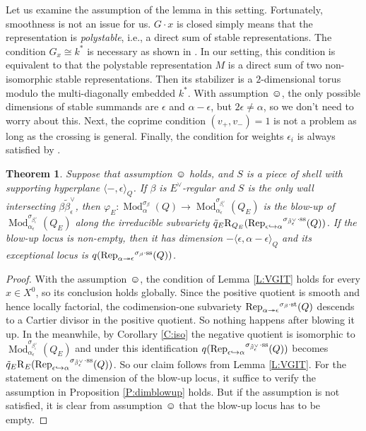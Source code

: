 \documentclass{amsart}
\newtheorem{theorem}{Theorem}[section]
\theoremstyle{definition}
\theoremstyle{remark}
\numberwithin{equation}{section}
\begin{document}
Let us examine the assumption of the lemma in this setting.
Fortunately, smoothness is not an issue for us. $G\cdot x$ is closed simply means that the representation is {\em polystable}, i.e., a direct sum of stable representations. The condition $G_x\cong k^*$ is necessary as shown in \cite[Counterexample 5.8]{T}. In our setting, this condition is equivalent to that the polystable representation $M$ is a direct sum of two non-isomorphic stable representations. Then its stabilizer is a $2$-dimensional torus modulo the multi-diagonally embedded $k^*$. With assumption $\smiley$, the only possible dimensions of stable summands are $\epsilon$ and $\alpha-\epsilon$, but $2\epsilon\neq\alpha$, so we don't need to worry about this. Next, the coprime condition $(v_+,v_-)=1$ is not a problem as long as the crossing is general. Finally, the condition for weights $\epsilon_i$ is always satisfied by \cite[Proposition 4.9]{T}.

\begin{theorem} \label{T:blow-up} Suppose that assumption $\smiley$ holds, and $S$ is a piece of shell with supporting hyperplane ${\langle{-,\epsilon}\rangle}_Q$. If $\beta$ is $E^\vee$-regular and $S$ is the only wall intersecting $\beta\tilde{\beta}_\epsilon^\vee$, then
$\varphi_E:{\operatorname{Mod}}_\alpha^{\sigma_\beta}(Q)\to{\operatorname{Mod}}_{\alpha_\epsilon}^{\sigma_{\beta_\epsilon^\vee}}(Q_E)$
is the blow-up of ${\operatorname{Mod}}_{\alpha_\epsilon}^{\sigma_{\beta_\epsilon^\vee}}(Q_E)$ along the irreducible subvariety $\tilde{q}_E{\operatorname{R}}_{Q_E}({\operatorname{Rep}}_{\epsilon\hookrightarrow\alpha}{^{\sigma_{{\tilde{\beta}_\epsilon^\vee}}\cdot{\rm {ss}}}}(Q))$. If the blow-up locus is non-empty, then it has dimension $-{\langle{\epsilon,\alpha-\epsilon}\rangle}_Q$ and its exceptional locus is $q({\operatorname{Rep}}_{\alpha\twoheadrightarrow\epsilon}{^{\sigma_{{\beta}}\cdot{\rm {ss}}}}(Q))$.
\end{theorem}

\begin{proof} With the assumption $\smiley$, the condition of Lemma \ref{L:VGIT} holds for every $x\in X^0$, so its conclusion holds globally. Since the positive quotient is smooth and hence locally factorial, the codimension-one subvariety ${\operatorname{Rep}}_{\alpha\twoheadrightarrow\epsilon}{^{\sigma_{{\beta}}\cdot{\rm {st}}}}(Q)$ descends to a Cartier divisor in the positive quotient. So nothing happens after blowing it up. In the meanwhile, by Corollary \ref{C:iso} the negative quotient is isomorphic to ${\operatorname{Mod}}_{\alpha_\epsilon}^{\sigma_{\beta_\epsilon^\vee}}(Q_E)$ and under this identification $q({\operatorname{Rep}}_{\epsilon\hookrightarrow\alpha}{^{\sigma_{{\tilde{\beta}_\epsilon^\vee}}\cdot{\rm {ss}}}}(Q))$ becomes $\tilde{q}_E{\operatorname{R}}_E({\operatorname{Rep}}_{\epsilon\hookrightarrow\alpha}{^{\sigma_{{\tilde{\beta}_\epsilon^\vee}}\cdot{\rm {ss}}}}(Q))$. So our claim follows from Lemma \ref{L:VGIT}. For the statement on the dimension of the blow-up locus, it suffice to verify the assumption in Proposition \ref{P:dimblowup} holds. But if the assumption is not satisfied, it is clear from assumption $\smiley$ that the blow-up locus has to be empty.
\end{proof}
\end{document}
